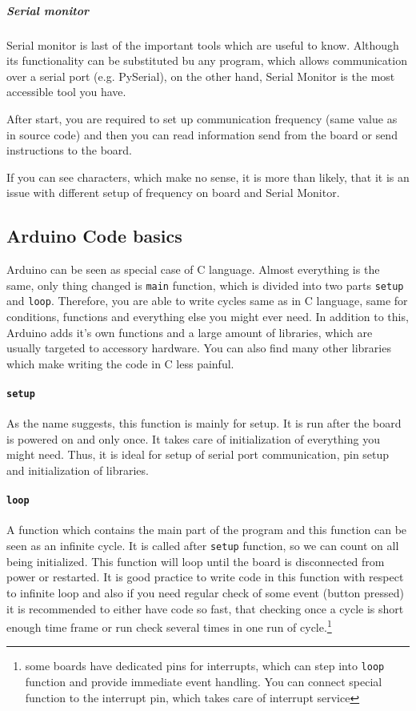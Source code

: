 \documentclass[12pt,titlepage]{article}
\begin{document}
        \subparagraph{Serial monitor}
        Serial monitor is last of the important tools which are useful to know. Although its functionality can be substituted bu any program, which allows communication over a serial port (e.g. PySerial), on the other hand, Serial Monitor is the most accessible tool you have.

        After start, you are required to set up communication frequency (same value as in source code) and then you can read information send from the board or send instructions to the board.

        If you can see characters, which make no sense, it is more than likely, that it is an issue with different setup of frequency on board and Serial Monitor.

    \subsection{Arduino Code basics}
    Arduino can be seen as special case of C language. Almost everything is the same, only thing changed is \texttt{main} function, which is divided into two parts \texttt{setup} and \texttt{loop}. Therefore, you are able to write cycles same as in C language, same for conditions, functions and everything else you might ever need. In addition to this, Arduino adds it's own functions and a large amount of libraries, which are usually targeted to accessory hardware. You can also find many other libraries which make writing the code in C less painful.

        \paragraph{\textbf{\texttt{setup}}}
        As the name suggests, this function is mainly for setup. It is run after the board is powered on and only once. It takes care of initialization of everything you might need. Thus, it is ideal for setup of serial port communication, pin setup and initialization of libraries.

        \paragraph{\textbf{\texttt{loop}}}
        A function which contains the main part of the program and this function can be seen as an infinite cycle. It is called after
        \texttt{setup} function, so we can count on all being initialized. This function will loop until the board is disconnected from power or restarted. It is good practice to write code in this function with respect to infinite loop and also if you need regular check of some event (button pressed) it is recommended to either have code so fast, that checking once a cycle is short enough time frame or run check several times in one run of cycle.\footnote{some boards have dedicated pins for interrupts, which can step into \texttt{loop} function and provide immediate event handling. You can connect special function to the interrupt pin, which takes care of interrupt service}
\end{document}
